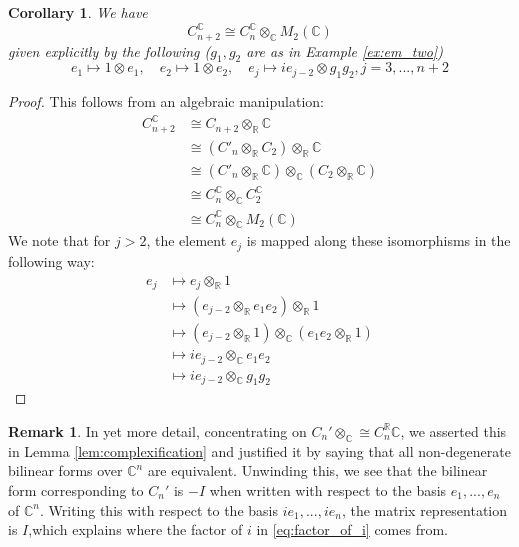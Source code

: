\documentclass[12pt]{article}
\theoremstyle{plain}
\newtheorem{cor}[thm]{Corollary}
\theoremstyle{definition}
\newtheorem{remark}[thm]{Remark}
\newcommand{\bb}[1]{\mathbb{#1}}
\begin{document}
	\begin{cor}
		We have
		\begin{equation}
			C_{n+2}^{\bb{C}} \cong C_n^{\bb{C}} \otimes_{\bb{C}}M_2(\bb{C})
		\end{equation}
		given explicitly by the following ($g_1,g_2$ are as in Example \ref{ex:em_two})
		\begin{equation}
			e_1 \longmapsto 1 \otimes e_1,\quad e_2 \longmapsto 1 \otimes e_2,\quad e_j \longmapsto ie_{j-2} \otimes g_1g_2, j = 3,...,n+2
		\end{equation}
	\end{cor}
	\begin{proof}
		This follows from an algebraic manipulation:
		\begin{align*}
			C_{n+2}^{\bb{C}} &\cong C_{n+2} \otimes_{\bb{R}}\bb{C}\\
			&\cong (C'_n \otimes_{\bb{R}} C_2) \otimes_{\bb{R}}\bb{C}\\
			&\cong (C'_{n}\otimes_{\bb{R}}\bb{C}) \otimes_{\bb{C}} (C_2 \otimes_{\bb{R}} \bb{C})\\
			&\cong C_{n}^{\bb{C}} \otimes_{\bb{C}}C_2^{\bb{C}}\\
			&\cong C_{n}^{\bb{C}} \otimes_{\bb{C}}M_2(\bb{C})
		\end{align*}
		We note that for $j > 2$, the element $e_j$ is mapped along these isomorphisms in the following way:
		\begin{align}
			e_j &\longmapsto e_j \otimes_{\bb{R}} 1\\
			&\longmapsto (e_{j-2} \otimes_{\bb{R}} e_1e_2) \otimes_{\bb{R}} 1\\
			&\longmapsto (e_{j-2} \otimes_{\bb{R}} 1) \otimes_{\bb{C}} (e_1e_2 \otimes_{\bb{R}} 1)\\
			&\label{eq:factor_of_i}\longmapsto ie_{j-2} \otimes_{\bb{C}} e_1e_2\\
			&\longmapsto ie_{j-2} \otimes_{\bb{C}} g_1g_2
		\end{align}
	\end{proof}
	\begin{remark}
		In yet more detail, concentrating on $C_n' \otimes_{\bb{C}} \cong C_n^{\bb{R}}\bb{C}$, we asserted this in Lemma \ref{lem:complexification} and justified it by saying that all non-degenerate bilinear forms over $\bb{C}^n$ are equivalent. Unwinding this, we see that the bilinear form corresponding to $C_n'$ is $-I$ when written with respect to the basis $e_1,...,e_n$ of $\bb{C}^n$. Writing this with respect to the basis $ie_1,...,ie_n$, the matrix representation is $I$,which explains where the factor of $i$ in \eqref{eq:factor_of_i} comes from.
	\end{remark}
\end{document}
